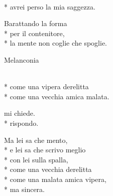 \documentclass[12pt]{book}
\begin{document}
\begin{poem}{}{}

\settowidth{\versewidth}{non meno è ciò che meriti.}


\begin{altverse}
\\*
avrei perso la mia saggezza.
\end{altverse}

\begin{altverse}
Barattando la forma \\*
per il contenitore, \\*
la mente non coglie che spoglie.
\end{altverse}


\end{poem}

\begin{poem}{Melanconia}{}

\settowidth{\versewidth}{non meno è ciò che meriti.}


\begin{altverse}
\\*
come una vipera derelitta\\*
come una vecchia amica malata.
\end{altverse}

\begin{altverse}
 mi chiede.\\*
 rispondo.
\end{altverse}

\begin{altverse}
Ma lei sa che mento,\\*
e lei sa che scrivo meglio\\*
con lei sulla spalla,\\*
come una vecchia derelitta\\*
come una malata amica vipera,\\*
ma sincera.
\end{altverse}


\end{poem}
\end{document}
